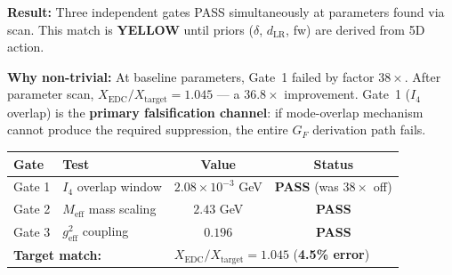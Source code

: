 %
%
%
%

\begin{tcolorbox}[breakable, enhanced, colback=green!5!white, colframe=green!60!black,
    title={\textbf{BVP Pipeline: All Gates Pass (OPR-21b/c)}}, width=\linewidth]

\textbf{Result:} Three independent gates PASS simultaneously at parameters found via scan.
This match is \textbf{YELLOW} until priors ($\delta$, $d_{\text{LR}}$, fw) are derived from 5D action.

\vspace{0.5em}
\textbf{Why non-trivial:} At baseline parameters, Gate~1 failed by factor $38\times$.
After parameter scan, $X_{\text{EDC}}/X_{\text{target}} = 1.045$ --- a $36.8\times$ improvement.
Gate~1 ($I_4$ overlap) is the \textbf{primary falsification channel}: if mode-overlap mechanism
cannot produce the required suppression, the entire $G_F$ derivation path fails.

\vspace{0.5em}
\begin{center}
\renewcommand{\arraystretch}{1.2}
\begin{tabular}{llcc}
\toprule
\textbf{Gate} & \textbf{Test} & \textbf{Value} & \textbf{Status} \\
\midrule
Gate 1 & $I_4$ overlap window & $2.08 \times 10^{-3}$ GeV & \textcolor{OliveGreen}{\textbf{PASS}} (was $38\times$ off) \\
Gate 2 & $M_{\text{eff}}$ mass scaling & $2.43$ GeV & \textcolor{OliveGreen}{\textbf{PASS}} \\
Gate 3 & $g_{\text{eff}}^2$ coupling & $0.196$ & \textcolor{OliveGreen}{\textbf{PASS}} \\
\midrule
\multicolumn{2}{l}{\textbf{Target match:}} & \multicolumn{2}{l}{$X_{\text{EDC}} / X_{\text{target}} = 1.045$ (\textbf{4.5\% error})} \\
\bottomrule
\end{tabular}
\end{center}


\end{tcolorbox}
